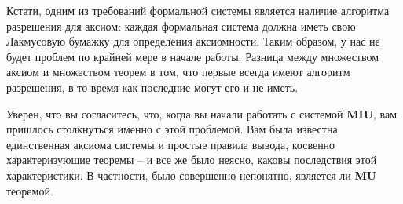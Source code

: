 \documentclass[../main.tex]{subfiles}
\begin{document}
Кстати, одним из требований формальной системы является наличие алгоритма разрешения для аксиом: каждая формальная система должна иметь свою Лакмусовую бумажку для определения аксиомности. Таким образом, у нас не будет проблем по крайней мере в начале работы. Разница между множеством аксиом и множеством теорем в том, что первые всегда имеют алгоритм разрешения, в то время как последние могут его и не иметь.

Уверен, что вы согласитесь, что, когда вы начали работать с системой \textbf{MIU}, вам пришлось столкнуться именно с этой проблемой. Вам была известна единственная аксиома системы и простые правила вывода, косвенно характеризующие теоремы \--- и все же было неясно, каковы последствия этой характеристики. В частности, было совершенно непонятно, является ли \textbf{MU} теоремой.

\end{document}

